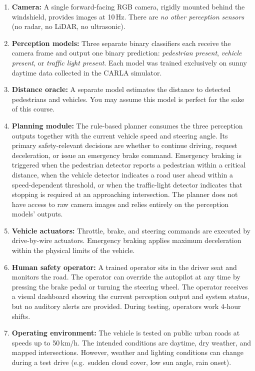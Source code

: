 \documentclass[nologo,a4paper,12pt]{article}
\begin{document}
\begin{enumerate}
  \item \textbf{Camera:} A single forward-facing RGB camera, rigidly mounted behind the windshield, provides images at 10\,Hz. There are \emph{no other perception sensors} (no radar, no LiDAR, no ultrasonic).
  \item \textbf{Perception models:} Three separate binary classifiers each receive the camera frame and output one binary prediction: \emph{pedestrian present}, \emph{vehicle present}, or \emph{traffic light present}. Each model was trained exclusively on sunny daytime data collected in the CARLA simulator.
  \item \textbf{Distance oracle:} A separate model estimates the distance to detected pedestrians and
    vehicles. You may assume this model is perfect for the sake of this course.
  \item \textbf{Planning module:} The rule-based planner consumes the three perception outputs together with the current vehicle speed and steering angle. Its primary safety-relevant decisions are whether to continue driving, request deceleration, or issue an emergency brake command. Emergency braking is triggered when the pedestrian detector reports a pedestrian within a critical distance, when the vehicle detector indicates a road user ahead within a speed-dependent
    threshold, or when the traffic-light detector indicates that stopping is required at an approaching intersection. The planner does not have access to raw camera images and relies entirely on the perception models' outputs.
  \item \textbf{Vehicle actuators:} Throttle, brake, and steering commands are executed by drive-by-wire actuators. Emergency braking applies maximum deceleration within the physical limits of the vehicle.
  \item \textbf{Human safety operator:} A trained operator sits in the driver seat and monitors the road. The operator can override the autopilot at any time by pressing the brake pedal or turning the steering wheel. The operator receives a visual dashboard showing the current perception output and system status, but no auditory alerts are provided. During testing, operators work 4-hour shifts.
  \item \textbf{Operating environment:} The vehicle is tested on public urban roads at speeds up to 50\,km/h. The intended conditions are daytime, dry weather, and mapped intersections. However, weather and lighting conditions can change during a test drive (e.g.\ sudden cloud cover, low sun angle, rain onset).
\end{enumerate}
\end{document}
